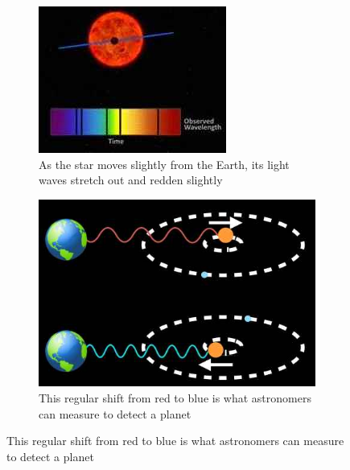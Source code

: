 \documentclass[]{article}
\begin{document}
\begin{figure}[H]
	\;\;\;
	\begin{subfigure}[t]{0.3\textwidth}
		\caption{As the star moves slightly from the Earth, its light waves stretch out and redden slightly}\label{fig:radio-velocity-technique1}
		\includegraphics[width=\textwidth]{radio-velocity-technique1}
	\end{subfigure}
	\;\;\;
	\begin{subfigure}[t]{0.3\textwidth}
		\caption{This regular shift from red to blue is what astronomers can measure to detect a planet}\label{fig:radio-velocity-technique2}
		\includegraphics[width=\textwidth]{radio-velocity-technique2}
	\end{subfigure}
\end{figure}
\end{document}

